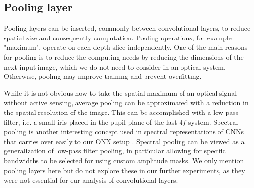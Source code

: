 \subsection*{Pooling layer}
Pooling layers can be inserted, commonly between convolutional layers, to reduce spatial size and consequently computation. Pooling operations, for example "maximum", operate on each depth slice independently. One of the main reasons for pooling is to reduce the computing needs by reducing the dimensions of the next input image, which we do not need to consider in an optical system. Otherwise, pooling may improve training and prevent overfitting.

While it is not obvious how to take the spatial maximum of an optical signal without active sensing, average pooling can be approximated with a reduction in the spatial resolution of the image. This can be accomplished with a low-pass filter, i.e. a small iris placed in the pupil plane of the last $4f$ system. Spectral pooling is another interesting concept used in spectral representations of CNNs that carries over easily to our ONN setup \cite{rippel2015spectral}. Spectral pooling can be viewed as a generalization of low-pass filter pooling, in particular allowing for specific bandwidths to be selected for using custom amplitude masks. We only mention pooling layers here but do not explore these in our further experiments, as they were not essential for our analysis of convolutional layers.

